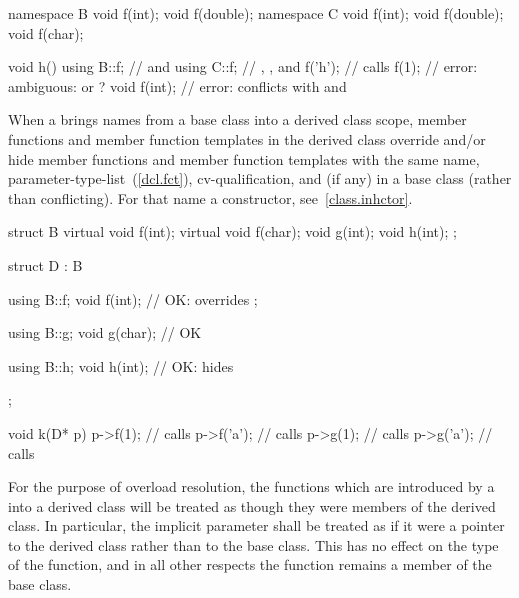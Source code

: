 \begin{codeblock}
namespace B {
  void f(int);
  void f(double);
}
namespace C {
  void f(int);
  void f(double);
  void f(char);
}

void h() {
  using B::f;       //  and 
  using C::f;       // , , and 
  f('h');           // calls 
  f(1);             // error: ambiguous:  or ?
  void f(int);      // error:  conflicts with  and 
}
\end{codeblock}
\exitexample
\exitnote

\pnum
{}%
When a  brings names from a base class into
a derived class scope, member functions and member function templates in
the derived class override and/or hide member functions and member
function templates with the same name,
parameter-type-list~(\ref{dcl.fct}), cv-qualification, and  (if any) in a base
class (rather than conflicting).
\enternote For  that name a constructor, see~\ref{class.inhctor}. \exitnote
\enterexample

\begin{codeblock}
struct B {
  virtual void f(int);
  virtual void f(char);
  void g(int);
  void h(int);
};

struct D : B {
  using B::f;
  void f(int);      // OK:  overrides ;

  using B::g;
  void g(char);     // OK

  using B::h;
  void h(int);      // OK:  hides 
};

void k(D* p)
{
  p->f(1);          // calls 
  p->f('a');        // calls 
  p->g(1);          // calls 
  p->g('a');        // calls 
}
\end{codeblock}
\exitexample

\pnum
{}%
For the purpose of overload resolution, the functions which are
introduced by a  into a derived class will
be treated as though they were members of the derived class. In
particular, the implicit  parameter shall be treated as if
it were a pointer to the derived class rather than to the base class.
This has no effect on the type of the function, and in all other
respects the function remains a member of the base class.

